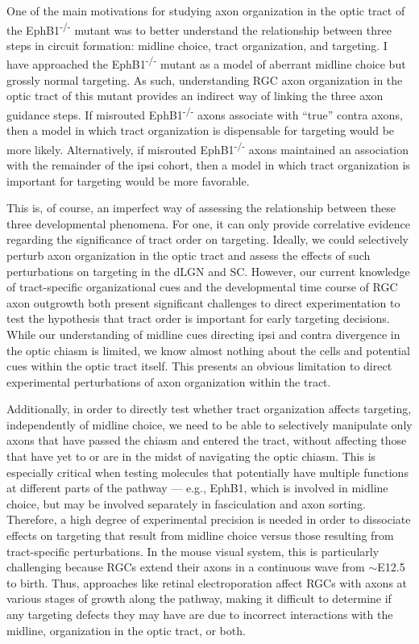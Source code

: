 \label{sec:LinkingEphB1}
One of the main motivations for studying axon organization in the optic tract of the EphB1\textsuperscript{-/-} mutant was to better understand the relationship between three steps in circuit formation: midline choice, tract organization, and targeting.
I have approached the EphB1\textsuperscript{-/-} mutant as a model of aberrant midline choice but grossly normal targeting.
As such, understanding RGC axon organization in the optic tract of this mutant provides an indirect way of linking the three axon guidance steps.
If misrouted EphB1\textsuperscript{-/-} axons associate with ``true'' contra axons, then a model in which tract organization is dispensable for targeting would be more likely.
Alternatively, if misrouted EphB1\textsuperscript{-/-} axons maintained an association with the remainder of the ipsi cohort, then a model in which tract organization is important for targeting would be more favorable.

This is, of course, an imperfect way of assessing the relationship between these three developmental phenomena. 
For one, it can only provide correlative evidence regarding the significance of tract order on targeting.
Ideally, we could selectively perturb axon organization in the optic tract and assess the effects of such perturbations on targeting in the dLGN and SC.
However, our current knowledge of tract-specific organizational cues and the developmental time course of RGC axon outgrowth both present significant challenges to direct experimentation to test the hypothesis that tract order is important for early targeting decisions.
While our understanding of midline cues directing ipsi and contra divergence in the optic chiasm is limited, we know almost nothing about the cells and potential cues within the optic tract itself.
This presents an obvious limitation to direct experimental perturbations of axon organization within the tract.

Additionally, in order to directly test whether tract organization affects targeting, independently of midline choice, we need to be able to selectively manipulate only axons that have passed the chiasm and entered the tract, without affecting those that have yet to or are in the midst of navigating the optic chiasm.
This is especially critical when testing molecules that potentially have multiple functions at different parts of the pathway --- e.g., EphB1, which is involved in midline choice, but may be involved separately in fasciculation and axon sorting. 
Therefore, a high degree of experimental precision is needed in order to dissociate effects on targeting that result from midline choice versus those resulting from tract-specific perturbations.
In the mouse visual system, this is particularly challenging because RGCs extend their axons in a continuous wave from $\sim$E12.5 to birth.
Thus, approaches like \inutero{} retinal electroporation affect RGCs with axons at various stages of growth along the pathway, making it difficult to determine if any targeting defects they may have are due to incorrect interactions with the midline, organization in the optic tract, or both.

